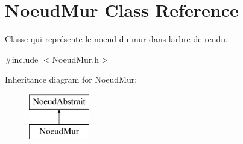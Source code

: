 \hypertarget{class_noeud_mur}{}\section{Noeud\+Mur Class Reference}
\label{class_noeud_mur}


Classe qui représente le noeud du mur dans l\textquotesingle{}arbre de rendu.  




{\ttfamily \#include $<$Noeud\+Mur.\+h$>$}

Inheritance diagram for Noeud\+Mur\+:\begin{figure}[H]
\begin{center}
\leavevmode
\includegraphics[height=2.000000cm]{class_noeud_mur}
\end{center}
\end{figure}
